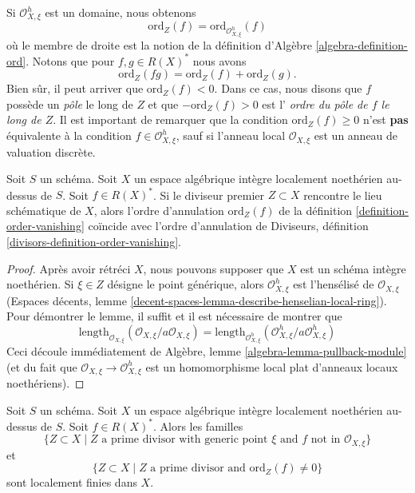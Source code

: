 \noindent
Si $\mathcal{O}_{X, \xi}^h$ est un domaine, nous obtenons
$$
\text{ord}_Z(f) = \text{ord}_{\mathcal{O}_{X, \xi}^h}(f)
$$
où le membre de droite est la notion de
la définition d'Algèbre \ref{algebra-definition-ord}.
Notons que pour $f, g \in R(X)^*$ nous avons
$$
\text{ord}_Z(fg) = \text{ord}_Z(f) + \text{ord}_Z(g).
$$
Bien sûr, il peut arriver que $\text{ord}_Z(f) < 0$.
Dans ce cas, nous disons que $f$ possède un {\it pôle} le long de $Z$
et que $-\text{ord}_Z(f) > 0$ est l'
{\it ordre du pôle de $f$ le long de $Z$}. Il est important de remarquer que
la condition $\text{ord}_Z(f) \geq 0$ n'est {\bf pas} équivalente
à la condition $f \in \mathcal{O}_{X, \xi}^h$, sauf si l'anneau local
$\mathcal{O}_{X, \xi}$ est un anneau de valuation discrète.

\begin{lemma}
\label{lemma-order-vanishing-agrees}
Soit $S$ un schéma. Soit $X$ un espace algébrique intègre localement noethérien
au-dessus de $S$. Soit $f \in R(X)^*$. Si le diviseur premier
$Z \subset X$ rencontre le lieu schématique de $X$, alors l'ordre
d'annulation $\text{ord}_Z(f)$ de la définition \ref{definition-order-vanishing}
coïncide avec l'ordre d'annulation de
Diviseurs, définition \ref{divisors-definition-order-vanishing}.
\end{lemma}

\begin{proof}
Après avoir rétréci $X$, nous pouvons supposer que $X$ est un schéma intègre noethérien.
Si $\xi \in Z$ désigne le point générique, alors
$\mathcal{O}_{X, \xi}^h$ est l'hensélisé de $\mathcal{O}_{X, \xi}$
(Espaces décents, lemme \ref{decent-spaces-lemma-describe-henselian-local-ring}).
Pour démontrer le lemme, il suffit et il est nécessaire de montrer que
$$
\text{length}_{\mathcal{O}_{X, \xi}}
(\mathcal{O}_{X, \xi}/a \mathcal{O}_{X, \xi}) =
\text{length}_{\mathcal{O}_{X, \xi}^h}
(\mathcal{O}_{X, \xi}^h/a \mathcal{O}_{X, \xi}^h)
$$
Ceci découle immédiatement de
Algèbre, lemme \ref{algebra-lemma-pullback-module}
(et du fait que $\mathcal{O}_{X, \xi} \to \mathcal{O}_{X, \xi}^h$
est un homomorphisme local plat d'anneaux locaux noethériens).
\end{proof}

\begin{lemma}
\label{lemma-divisor-locally-finite}
Soit $S$ un schéma. Soit $X$ un espace algébrique intègre localement noethérien
au-dessus de $S$. Soit $f \in R(X)^*$. Alors les familles
$$
\{Z \subset X \mid Z\text{ a prime divisor with generic point }\xi
\text{ and }f\text{ not in }\mathcal{O}_{X, \xi}\}
$$
et
$$
\{Z \subset X \mid Z \text{ a prime divisor and }\text{ord}_Z(f) \not = 0\}
$$
sont localement finies dans $X$.
\end{lemma}

